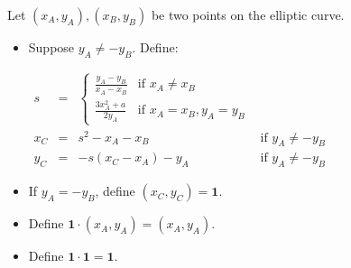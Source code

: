 \begin{frame}
\begin{emptyTheorem}
Let $\left(x_A, y_A\right), \left(x_B, y_B\right)$ be two points on the elliptic curve. 
\begin{itemize}
\item Suppose $y_A\neq -y_B$. Define:

$\begin{array}{rcl|l}
s&=& \left\{ \begin{array}{ll}\displaystyle\frac{y_A-y_B}{x_A-x_B} &\displaystyle\text{if } x_A\neq x_B \\\displaystyle \frac{3x_A^2+a}{2y_A}&\text{if }x_A=x_B, y_A=y_B \end{array} \right.\\
x_C &=& s^2 - x_A-x_B &\text{if } y_A\neq -y_B\\
y_C &=& -s(x_C-x_A)-y_A&\text{if } y_A\neq -y_B 
\end{array}
$
\item If $y_A= -y_B$, define $(x_C, y_C) = \mathbf 1$.
\item Define $\mathbf 1\cdot \left(x_A, y_A\right) = \left(x_A,y_A\right)$.
\item Define $\mathbf 1\cdot \mathbf 1 = \mathbf 1$.

\end{itemize}
\end{emptyTheorem}
\end{frame}